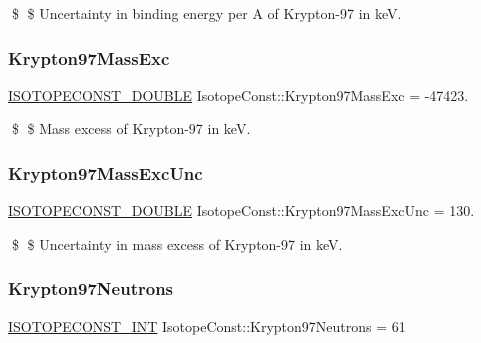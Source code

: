 \$ \$ Uncertainty in binding energy per A of Krypton-\/97 in keV. \mbox{\label{group___isotope_const-_krypton-_kr97_ga5dbb9aad0c439128ced5ca238773a0be}} 
\subsubsection{\texorpdfstring{Krypton97\+Mass\+Exc}{Krypton97MassExc}}
{\footnotesize\ttfamily \mbox{\hyperlink{group___isotope_const-_macros_ga8f45a7272ce02c0b4c65c44636ed719a}{I\+S\+O\+T\+O\+P\+E\+C\+O\+N\+S\+T\+\_\+\+D\+O\+U\+B\+LE}} Isotope\+Const\+::\+Krypton97\+Mass\+Exc = -\/47423.}

\$ \$ Mass excess of Krypton-\/97 in keV. \mbox{\label{group___isotope_const-_krypton-_kr97_ga6a24a1c314a9d3b6c996d5f211566871}} 
\subsubsection{\texorpdfstring{Krypton97\+Mass\+Exc\+Unc}{Krypton97MassExcUnc}}
{\footnotesize\ttfamily \mbox{\hyperlink{group___isotope_const-_macros_ga8f45a7272ce02c0b4c65c44636ed719a}{I\+S\+O\+T\+O\+P\+E\+C\+O\+N\+S\+T\+\_\+\+D\+O\+U\+B\+LE}} Isotope\+Const\+::\+Krypton97\+Mass\+Exc\+Unc = 130.}

\$ \$ Uncertainty in mass excess of Krypton-\/97 in keV. \mbox{\label{group___isotope_const-_krypton-_kr97_gad83d91dca1c352f00979efdca94f20ce}} 
\subsubsection{\texorpdfstring{Krypton97\+Neutrons}{Krypton97Neutrons}}
{\footnotesize\ttfamily \mbox{\hyperlink{group___isotope_const-_macros_ga5f18360b3e99483a35c32d789e62621c}{I\+S\+O\+T\+O\+P\+E\+C\+O\+N\+S\+T\+\_\+\+I\+NT}} Isotope\+Const\+::\+Krypton97\+Neutrons = 61}

